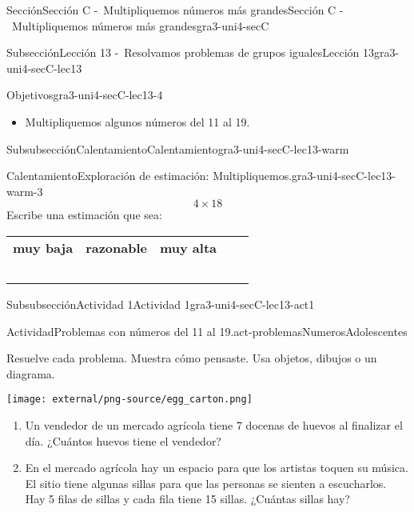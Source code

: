 \documentclass[twoside,10pt,]{article}
\newcommand{\tabularfont}{\relax}
\newcommand{\hrulethin}  {\noalign{\hrule height 0.04em}}
\begin{document}
\begin{sectionptx}{Sección}{Sección C -~Multipliquemos números más grandes}{}{Sección C -~Multipliquemos números más grandes}{}{}{gra3-uni4-secC}
\begin{subsectionptx}{Subsección}{Lección 13 -~Resolvamos problemas de grupos iguales}{}{Lección 13}{}{}{gra3-uni4-secC-lec13}
\begin{objectives}{Objetivos}{gra3-uni4-secC-lec13-4}
%
\begin{itemize}[label=\textbullet]
\item{}Multipliquemos algunos números del 11 al 19.%
\end{itemize}
\end{objectives}
%
%
\typeout{************************************************}
\typeout{************************************************}
%
\begin{subsubsectionptx}{Subsubsección}{Calentamiento}{}{Calentamiento}{}{}{gra3-uni4-secC-lec13-warm}
\begin{exploration}{Calentamiento}{Exploración de estimación: Multipliquemos.}{gra3-uni4-secC-lec13-warm-3}%
%
\begin{equation*}
4\times 18
\end{equation*}
Escribe una estimación que sea:%
\begin{center}%
{\tabularfont%
\begin{tabular}{lAlAl}
{\bfseries{}muy baja}&{\bfseries{}razonable}&{\bfseries{}muy alta}\tabularnewline\hrulethin
~&~&~
\end{tabular}
}%
\end{center}%
\end{exploration}%
\end{subsubsectionptx}
%
%
\typeout{************************************************}
\typeout{************************************************}
%
\begin{subsubsectionptx}{Subsubsección}{Actividad 1}{}{Actividad 1}{}{}{gra3-uni4-secC-lec13-act1}
\begin{activity}{Actividad}{Problemas con números del 11 al 19.}{act-problemasNumerosAdolescentes}%
\begin{sidebyside}{2}{0.05}{0.05}{0.1}%
\begin{sbspanel}{0.5}%
Resuelve cada problema. Muestra cómo pensaste. Usa objetos, dibujos o un diagrama.%
\end{sbspanel}%
\begin{sbspanel}{0.3}%
\texttt{[image: external/png-source/egg\_carton.png]}
\end{sbspanel}%
\end{sidebyside}%
%
\begin{enumerate}
\item{}Un vendedor de un mercado agrícola tiene 7 docenas de huevos al finalizar el día. ¿Cuántos huevos tiene el vendedor?%
\item{}En el mercado agrícola hay un espacio para que los artistas toquen su música. El sitio tiene algunas sillas para que las personas se sienten a escucharlos. Hay 5 filas de sillas y cada fila tiene 15 sillas. ¿Cuántas sillas hay?%

\end{enumerate}
\end{activity}
\end{subsubsectionptx}
\end{subsectionptx}
\end{sectionptx}
\end{document}
